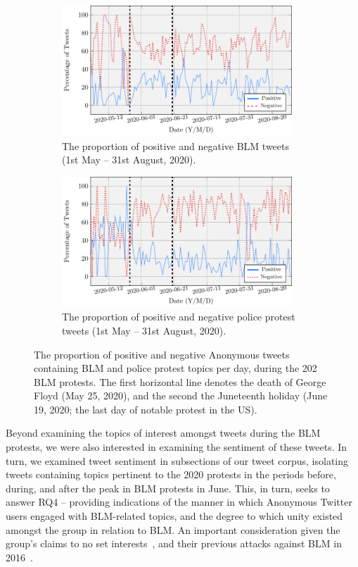 \documentclass[letterpaper]{article}
\begin{document}
\begin{figure}[!htp]
\centering
\begin{subfigure}[b]{0.45\textwidth}
\centering
\includegraphics[width=0.95\textwidth]{blm_sentiment.pdf}
\caption{The proportion of positive and negative BLM tweets (1st May -- 31st August, 2020).}
\label{fig:avgSentimentsBLM}
\end{subfigure}
\quad
\begin{subfigure}[b]{0.45\textwidth}
\centering
\includegraphics[width=0.95\textwidth]{police_sentiment.pdf}
\caption{The proportion of positive and negative police protest tweets (1st May -- 31st August, 2020).}
\label{fig:avgSentimentsPolice}
\end{subfigure}
\caption{The proportion of positive and negative Anonymous tweets containing BLM and police protest topics per day, during the 202 BLM protests. The first horizontal line denotes the death of George Floyd (May 25, 2020), and the second the Juneteenth holiday (June 19, 2020; the last day of notable protest in the US).}
\label{fig:avgSentimentsFiltered}
\end{figure}

Beyond examining the topics of interest amongst tweets during the BLM protests, we were also interested in examining the sentiment of these tweets. In turn, we examined tweet sentiment in subsections of our tweet corpus, isolating tweets containing topics pertinent to the 2020 protests in the periods before, during, and after the peak in BLM protests in June. This, in turn, seeks to answer RQ4 -- providing indications of the manner in which Anonymous Twitter users engaged with BLM-related topics, and the degree to which unity existed amongst the group in relation to BLM. An important consideration given the group's claims to no set interests~\cite{Olson2013}, and their previous attacks against BLM in 2016~\cite{Verge2016}.
\end{document}
